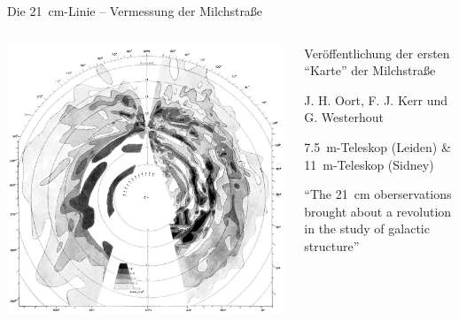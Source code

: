 \documentclass[compress, aspectratio=169]{beamer}
\begin{document}
\begin{frame}{Die \SI{21}{\centi\meter}-Linie – Vermessung der Milchstraße}%
  \begin{columns}[c, onlytextwidth]
    \begin{column}{0.47\textwidth}%
      \includegraphics[width=\textwidth, angle=180]{./images/original_map.png}%
    \end{column}%
    \begin{column}{0.47\textwidth}%
      \begin{description}[Messung]
        \item[1958] Veröffentlichung der ersten \enquote{Karte} der Milchstraße
        \item[Autoren] J. H. Oort, F. J. Kerr und G. Westerhout
        \item[Messung] \SI{7.5}{\meter}-Teleskop (Leiden) \&  \SI{11}{\meter}-Teleskop (Sidney)
      \end{description}

      \begin{center}
      \parbox{0.85\linewidth}{\enquote{The \SI{21}{\centi\meter} oberservations brought about a revolution in the study of galactic structure}}
      \end{center}
    \end{column}%
  \end{columns}
\end{frame}
\end{document}
